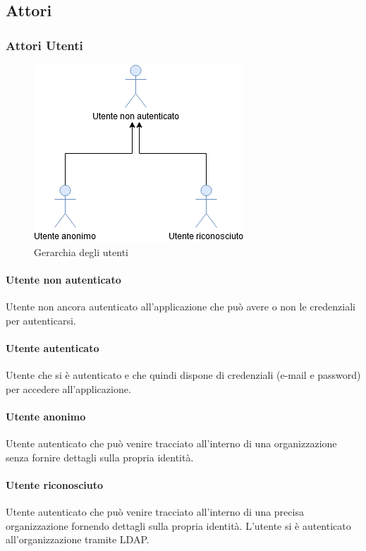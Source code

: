 \subsection{Attori}
\subsubsection{Attori Utenti}

\begin{figure}[h]
  \caption{Gerarchia degli utenti}
  \centering
    \includegraphics[scale=0.6]{sezioni/UseCase/Immagini/Utenti.png}
\end{figure}

\paragraph{Utente non autenticato}
Utente non ancora autenticato all'applicazione che può avere o non le credenziali per autenticarsi.
\paragraph{Utente autenticato}
Utente che si è autenticato e che quindi dispone di credenziali (e-mail e password) per accedere all'applicazione.
\paragraph{Utente anonimo}
Utente autenticato che può venire tracciato all'interno di una organizzazione senza fornire dettagli sulla propria identità.
\paragraph{Utente riconosciuto}
Utente autenticato che può venire tracciato all'interno di una precisa organizzazione fornendo dettagli sulla propria identità.
L'utente si è autenticato all'organizzazione tramite LDAP.




